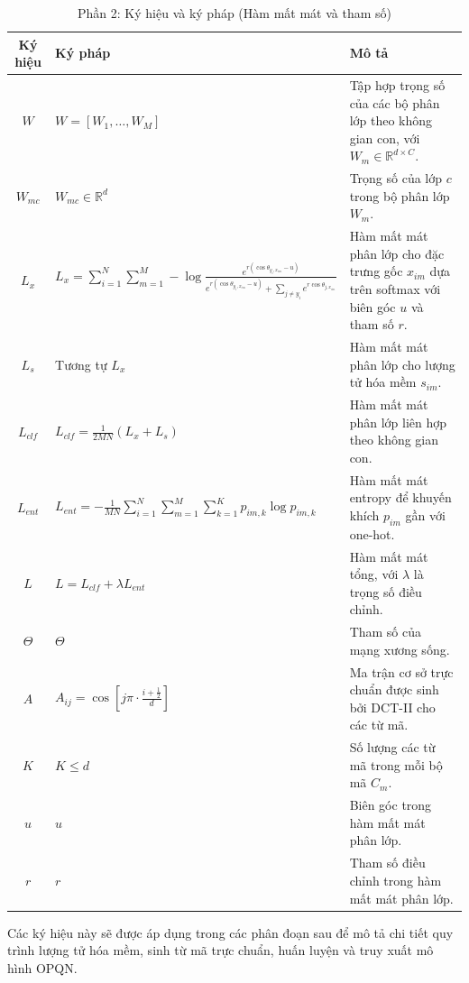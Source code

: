 \begin{table}[h!]
    \centering
    \begin{tabular}{|c|p{6cm}|p{5cm}|}
        \hline
        \textbf{Ký hiệu} & \textbf{Ký pháp} & \textbf{Mô tả} \\ \hline
        $W$ & $W = [W_1, \dots, W_M]$ & Tập hợp trọng số của các bộ phân lớp theo không gian con, với $W_m \in \mathbb{R}^{d \times C}$. \\ \hline
        $W_{mc}$ & $W_{mc} \in \mathbb{R}^d$ & Trọng số của lớp $c$ trong bộ phân lớp $W_m$. \\ \hline
        $L_x$ & $L_x = \sum_{i=1}^N \sum_{m=1}^M -\log \frac{e^{r (\cos \theta_{y_i, x_{im}} - u)}}{e^{r (\cos \theta_{y_i, x_{im}} - u)} + \sum_{j \neq y_i} e^{r \cos \theta_{j, x_{im}}}}$ & Hàm mất mát phân lớp cho đặc trưng gốc $x_{im}$ dựa trên softmax với biên góc $u$ và tham số $r$. \\ \hline
        $L_s$ & Tương tự $L_x$ & Hàm mất mát phân lớp cho lượng tử hóa mềm $s_{im}$. \\ \hline
        $L_{clf}$ & $L_{clf} = \frac{1}{2MN} (L_x + L_s)$ & Hàm mất mát phân lớp liên hợp theo không gian con. \\ \hline
        $L_{ent}$ & $L_{ent} = -\frac{1}{MN} \sum_{i=1}^N \sum_{m=1}^M \sum_{k=1}^K p_{im,k} \log p_{im,k}$ & Hàm mất mát entropy để khuyến khích $p_{im}$ gần với one-hot. \\ \hline
        $L$ & $L = L_{clf} + \lambda L_{ent}$ & Hàm mất mát tổng, với $\lambda$ là trọng số điều chỉnh. \\ \hline
        $\Theta$ & $\Theta$ & Tham số của mạng xương sống. \\ \hline
        $A$ & $A_{ij} = \cos\left[j\pi \cdot \frac{i + \frac{1}{2}}{d}\right]$ & Ma trận cơ sở trực chuẩn được sinh bởi DCT-II cho các từ mã. \\ \hline
        $K$ & $K \leq d$ & Số lượng các từ mã trong mỗi bộ mã $C_m$. \\ \hline
        $u$ & $u$ & Biên góc trong hàm mất mát phân lớp. \\ \hline
        $r$ & $r$ & Tham số điều chỉnh trong hàm mất mát phân lớp. \\ \hline
    \end{tabular}
    \caption{Phần 2: Ký hiệu và ký pháp (Hàm mất mát và tham số)}
    \label{tab:terms_part2}
\end{table}


Các ký hiệu này sẽ được áp dụng trong các phân đoạn sau để mô tả chi tiết quy trình lượng tử hóa mềm, sinh từ mã trực chuẩn, huấn luyện và truy xuất mô hình OPQN.


